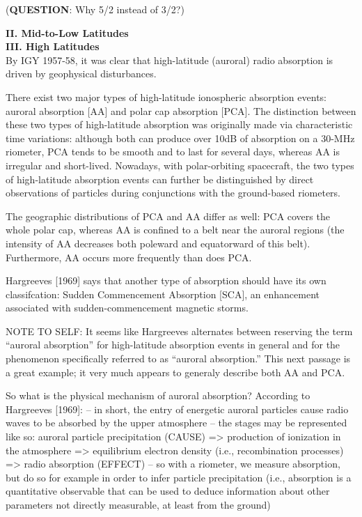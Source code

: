     (\textbf{QUESTION}: Why 5/2 instead of 3/2?)

\textbf{II. Mid-to-Low Latitudes} \\  

\textbf{III. High Latitudes} \\  
   By IGY 1957-58, it was clear that high-latitude (auroral) radio
   absorption is driven by geophysical disturbances.

   There exist two major types of high-latitude ionospheric absorption 
   events: auroral absorption [AA] and polar cap absorption [PCA].
   The distinction between these two types of high-latitude absorption was
   originally made via characteristic time variations: although both can
   produce over 10dB of absorption on a 30-MHz riometer, PCA tends to be
   smooth and to last for several days, whereas AA is irregular and
   short-lived. Nowadays, with polar-orbiting spacecraft, the two types
   of high-latitude absorption events can further be distinguished by
   direct observations of particles during conjunctions with the
   ground-based riometers.

   The geographic distributions of PCA and AA differ as well: PCA
   covers the whole polar cap, whereas AA is confined to a belt near the
   auroral regions (the intensity of AA decreases both poleward and
   equatorward of this belt). Furthermore, AA occurs more frequently
   than does PCA.

   Hargreeves [1969] says that another type of absorption should have its
   own classifcation: Sudden Commencement Absorption [SCA], an enhancement
   associated with sudden-commencement magnetic storms.

   NOTE TO SELF: It seems like Hargreeves alternates between reserving
   the term ``auroral absorption'' for high-latitude absorption events
   in general and for the phenomenon specifically referred to as
   ``auroral absorption.'' This next passage is a great example; it very
   much appears to generaly describe both AA and PCA.

   So what is the physical mechanism of auroral absorption? According to
   Hargreeves [1969]:
   -- in short, the entry of energetic auroral particles cause radio waves
   to be absorbed by the upper atmosphere
   -- the stages may be represented like so: auroral particle
   precipitation (CAUSE) => production of ionization in the atmosphere =>
   equilibrium electron density (i.e., recombination processes) => radio
   absorption (EFFECT)
   -- so with a riometer, we measure absorption, but do so for example in
   order to infer particle precipitation (i.e., absorption is a
   quantitative observable that can be used to deduce information about
   other parameters not directly measurable, at least from the ground)

